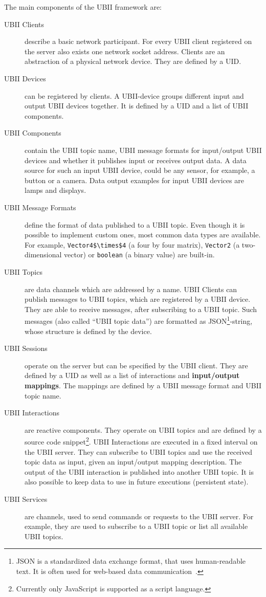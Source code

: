 The main components of the \ac{UBII} framework are:
\begin{description}
	\item[\ac{UBII} Clients] describe a basic network participant. For every \ac{UBII} client registered on the server also exists one network socket address. Clients are an abstraction of a physical network device. They are defined by a \ac{UID}. 
	\item[\ac{UBII} Devices] can be registered by clients. A \ac{UBII}-device groups different input and output \ac{UBII} devices together. It is defined by a \ac{UID} and a list of \ac{UBII} components.
  \item[\ac{UBII} Components] contain the \ac{UBII} topic name, \ac{UBII} message formats for input/output \ac{UBII} devices and whether it publishes input or receives output data. A data source for such an input \ac{UBII} device, could be any sensor, for example, a button or a camera. Data output examples for input \ac{UBII} devices are lamps and displays.
  \item[\ac{UBII} Message Formats] define the format of data published to a \ac{UBII} topic. Even though it is possible to implement custom ones, most common data types are available. For example, \lstinline[mathescape=true]{Vector4$\times$4} (a four by four matrix), \lstinline{Vector2} (a two-dimensional vector) or \lstinline{boolean} (a binary value) are built-in. %
	\item[\ac{UBII} Topics] are data channels which are addressed by a name. \ac{UBII} Clients can publish messages to \ac{UBII} topics, which are registered by a \ac{UBII} device. They are able to receive messages, after subscribing to a \ac{UBII} topic. Such messages (also called \enquote{\ac{UBII} topic data}) are formatted as JSON\footnote{JSON is a standardized data exchange format, that uses human-readable text. It is often used for web-based data communication~\cite[iii]{ECMAInternational.2017}.}-string, whose structure is defined by the device.
	\item[\ac{UBII} Sessions] operate on the server but can be specified by the \ac{UBII} client. They are defined by a \ac{UID} as well as a list of interactions and \textbf{input/output mappings}. The mappings are defined by a \ac{UBII} message format and \ac{UBII} topic name.
	\item[\ac{UBII} Interactions] are reactive components. They operate on \ac{UBII} topics and are defined by a source code snippet\footnote{Currently only JavaScript is supported as a script language.}. \ac{UBII} Interactions are executed in a fixed interval on the \ac{UBII} server. They can subscribe to \ac{UBII} topics and use the received topic data as input, given an input/output mapping description. The output of the \ac{UBII} interaction is published into another \ac{UBII} topic. It is also possible to keep data to use in future executions (persistent state).
	\item[\ac{UBII} Services] are channels, used to send commands or requests to the \ac{UBII} server. For example, they are used to subscribe to a \ac{UBII} topic or list all available \ac{UBII} topics.
\end{description}

